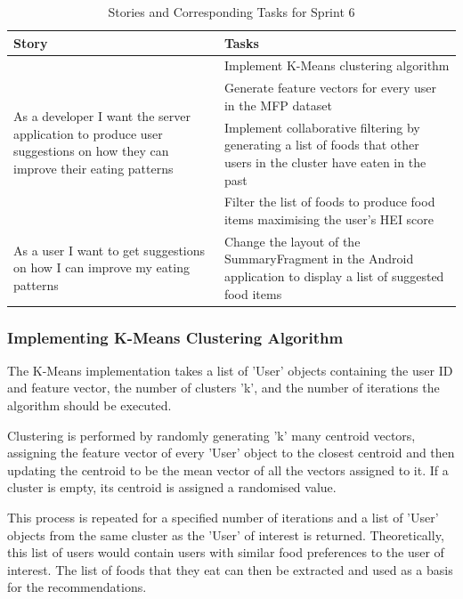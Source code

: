 \documentclass{article}
\begin{document}
\begin{table}[h]
\centering
\hspace*{-2.1cm}
\begin{tabular}{||m{6cm}|m{9cm}||}
\hline
    Story & Tasks \\ [0.5ex] 
    \hline
    \multirow{4}{\hsize}{As a developer I want the server application to produce user suggestions on how they can improve their eating patterns} 
                                & Implement K-Means clustering algorithm \\\cline{2-2}
                                & Generate feature vectors for every user in the MFP dataset \\\cline{2-2}
                                & Implement collaborative filtering by generating a list of foods that other users in the cluster have eaten in the past \\\cline{2-2}
                                & Filter the list of foods to produce food items maximising the user's HEI score \\
    \hline
    As a user I want to get suggestions on how I can improve my eating patterns & Change the layout of the SummaryFragment in the Android application to display a list of suggested food items \\
    \hline
\end{tabular}
\caption{Stories and Corresponding Tasks for Sprint 6}
\label{table:stories_tasks_sprint_6}
\end{table}

\subsubsection{Implementing K-Means Clustering Algorithm}
The K-Means implementation takes a list of 'User' objects containing the user ID and feature vector, the number of clusters 'k', and the number of iterations the algorithm should be executed. 

\bigskip
\noindent Clustering is performed by randomly generating 'k' many centroid vectors, assigning the feature vector of every 'User' object to the closest centroid and then updating the centroid to be the mean vector of all the vectors assigned to it. If a cluster is empty, its centroid is assigned a randomised value.

\bigskip
\noindent This process is repeated for a specified number of iterations and a list of 'User' objects from the same cluster as the 'User' of interest is returned. Theoretically, this list of users would contain users with similar food preferences to the user of interest. The list of foods that they eat can then be extracted and used as a basis for the recommendations.
\end{document}
